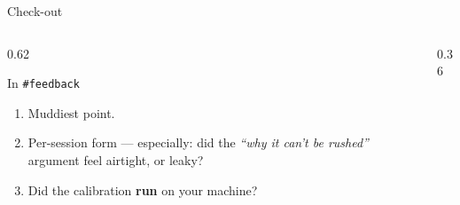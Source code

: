 \documentclass[aspectratio=169,11pt]{beamer}
\begin{document}
\begin{frame}{Check-out}
  \begin{columns}[T]
    \begin{column}{0.62\textwidth}
      \begin{block}{In \texttt{\#feedback}}
        \begin{enumerate}\small
          \item Muddiest point.
          \item Per-session form --- especially: did the \emph{``why it can't be
            rushed''} argument feel airtight, or leaky?
          \item Did the calibration \textbf{run} on your machine?
        \end{enumerate}
      \end{block}
    \end{column}
    \begin{column}{0.36\textwidth}
    \end{column}
  \end{columns}
\end{frame}

\end{document}
